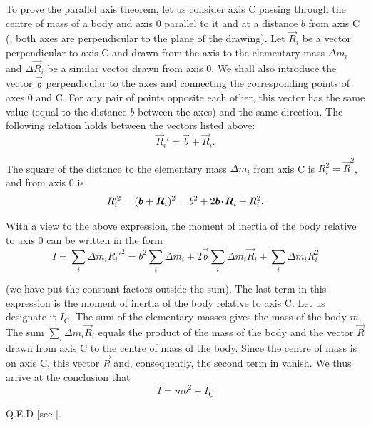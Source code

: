 To prove the parallel axis theorem, let us consider axis C passing through the centre of mass of a body and axis $0$ parallel to it and at a distance $b$ from axis C (, both axes are perpendicular to the plane of the drawing). Let $\vec{R}_i$ be a vector perpendicular to axis C and drawn from the axis to the elementary mass $\Delta m_i$ and $\Delta\vec{R}_i$ be a similar vector drawn from axis $0$. We shall also introduce the vector $\vec{b}$ perpendicular to the axes and connecting the corresponding points of axes $0$ and C. For any pair of points opposite each other, this vector has the same value (equal to the distance $b$ between the axes) and the same direction. The following relation holds between the vectors listed above:
\begin{equation*}
\vec{R}_i' = \vec{b} + \vec{R}_i.
\end{equation*}

The square of the distance to the elementary mass $\Delta m_i$ from axis C is $R_i^2=\vec{R}^2$, and from axis $0$ is
\begin{equation*}
R_i'^2 = (\boldsymbol{b} + \boldsymbol{R}_i)^2 = b^2 + 2\boldsymbol{b\!\cdot\!R}_i + R_i^2.
\end{equation*}

\noindent
With a view to the above expression, the moment of inertia of the body relative to axis $0$ can be written in the form
\begin{equation}\label{eq:5_24}
I = \sum_i \Delta m_i R_i'^2 = b^2 \sum_i \Delta m_i + 2\vec{b} \sum_i \Delta m_i \vec{R}_i + \sum_i \Delta m_i R_i^2
\end{equation}

\noindent
(we have put the constant factors outside the sum). The last term in this expression is the moment of inertia of the body relative to axis C. Let us designate it $I_{\text{C}}$. The sum of the elementary masses gives the mass of the body $m$. The sum $\sum_i\Delta m_i\vec{R}_i$ equals the product of the mass of the body and the vector $\vec{R}$ drawn from axis C to the centre of mass of the body. Since the centre of mass is on axis C, this vector $\vec{R}$ and, consequently, the second term in  vanish. We thus arrive at the conclusion that
\begin{equation*}
I = mb^2 + I_{\text{C}}
\end{equation*}

\noindent
Q.E.D [see ].

